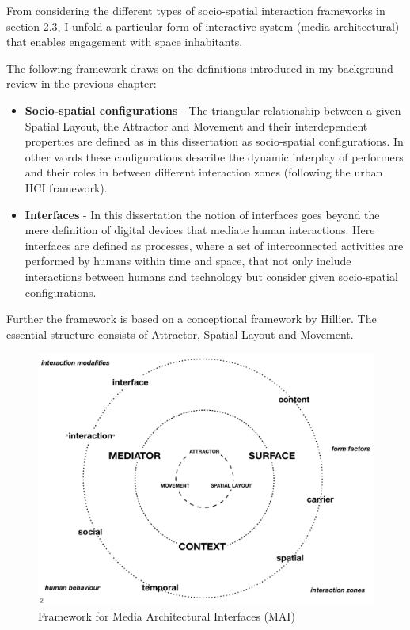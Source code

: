 From considering the different types of socio-spatial interaction frameworks in section 2.3, I unfold a particular form of interactive system (media architectural) that enables engagement with space inhabitants. 

The following framework draws on the definitions introduced in my background review in the previous chapter: 
\begin{itemize}
\item \textbf{Socio-spatial configurations}  - 
The triangular relationship between a given Spatial Layout, the Attractor and Movement and their interdependent properties are defined as in this dissertation as socio-spatial configurations. In other words these configurations describe the dynamic interplay of performers and their roles in between different interaction zones (following the urban HCI framework).
\item \textbf{Interfaces}  -  
In this dissertation the notion of interfaces goes beyond the mere definition of digital devices that mediate human interactions. Here interfaces are defined as processes, where a set of interconnected activities are performed by humans within time and space, that not only include interactions between humans and technology but consider given socio-spatial configurations. 
\end{itemize}

Further the framework is based on a conceptional framework by Hillier. The essential structure consists of Attractor, Spatial Layout and Movement.  

\begin{figure}[htp]
\centering
\includegraphics[width=\textwidth]{Illustrations/MEd_Carr_Cont_Framework.png}
\caption{Framework for Media Architectural Interfaces (MAI)}
\label{fig:MAI_Framework_1}
\end{figure}

